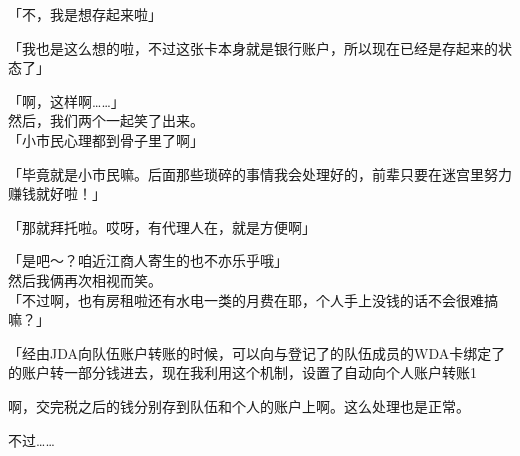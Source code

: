 「不，我是想存起来啦」

「我也是这么想的啦，不过这张卡本身就是银行账户，所以现在已经是存起来的状态了」

「啊，这样啊……」\\

然后，我们两个一起笑了出来。\\

「小市民心理都到骨子里了啊」

「毕竟就是小市民嘛。后面那些琐碎的事情我会处理好的，前辈只要在迷宫里努力赚钱就好啦！」

「那就拜托啦。哎呀，有代理人在，就是方便啊」

「是吧～？咱近江商人寄生的也不亦乐乎哦」\\

然后我俩再次相视而笑。\\

「不过啊，也有房租啦还有水电一类的月费在耶，个人手上没钱的话不会很难搞嘛？」

「经由JDA向队伍账户转账的时候，可以向与登记了的队伍成员的WDA卡绑定了的账户转一部分钱进去，现在我利用这个机制，设置了自动向个人账户转账1%

啊，交完税之后的钱分别存到队伍和个人的账户上啊。这么处理也是正常。

不过……\\

